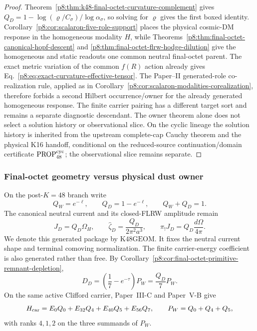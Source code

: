 \documentclass[12pt,a4paper]{article}
\begin{document}
\begin{proof}
Theorem~\ref{p8:thm:k48-final-octet-curvature-complement} gives
$Q_D=1-\log(\varrho/C_\sigma)/\log\alpha_\sigma$, so solving for $\varrho$
gives the first boxed identity.  Corollary~\ref{p8:cor:scalaron-five-role-support}
places the physical cosmic-DM response in the homogeneous modality $H$, while
Theorems~\ref{p8:thm:final-octet-canonical-hopf-descent} and
\ref{p8:thm:final-octet-flrw-hodge-dilution} give the homogeneous and static
readouts one common neutral final-octet parent.  The exact metric variation of
the common $f(R)$ action already gives
Eq.~\eqref{p8:eq:exact-curvature-effective-tensor}.  The Paper--II generated-role
co-realization rule, applied as in
Corollary~\ref{p8:cor:scalaron-modalities-corealization}, therefore forbids a
second Hilbert occurrence/owner for the already generated homogeneous response.
The finite carrier pairing has a different target sort and remains a separate
diagnostic descendant.  The owner theorem alone does not select a solution
history or observational slice.  On the cyclic lineage the solution history is inherited from the upstream
complete-cap Cauchy theorem and the physical K16 handoff, conditional on the
reduced-source continuation/domain certificate
\(\mathrm{PROP}^{\rm cyc}_{48}\); the observational slice remains separate.
\end{proof}

\subsubsection{Final-octet geometry versus physical dust owner}
On the post-$K=48$ branch write
\[
 \boxed{Q_W=e^{-\ell},\qquad Q_D=1-e^{-\ell},\qquad Q_W+Q_D=1.}
\]
The canonical neutral current and its closed-FLRW amplitude remain
\[
 J_D=Q_D\Omega_H,
 \qquad
 \widehat\zeta_D=\frac{Q_D}{2\pi^2a^3},
 \qquad
 \pi_!J_D=Q_D\frac{d\Omega}{4\pi}.
\]
We denote this generated package by $\mathrm{K48GEOM}$.  It fixes the neutral
current shape and terminal comoving normalization.  The finite carrier-energy
coefficient is also generated rather than free.  By
Corollary~\ref{p8:cor:final-octet-primitive-remnant-depletion},
\[
 D_D=\left(\frac17-e^{-\tau}\right)P_W
     =\frac{Q_D}{7}P_W.
\]
On the same active Clifford carrier, Paper~III-C and Paper~V-B give
\[
 H_{\rm car}=E_0Q_0+E_{32}Q_4+E_{40}Q_5+E_{56}Q_7,
 \qquad P_W=Q_0+Q_4+Q_5,
\]
with ranks $4,1,2$ on the three summands of $P_W$.
\end{document}
